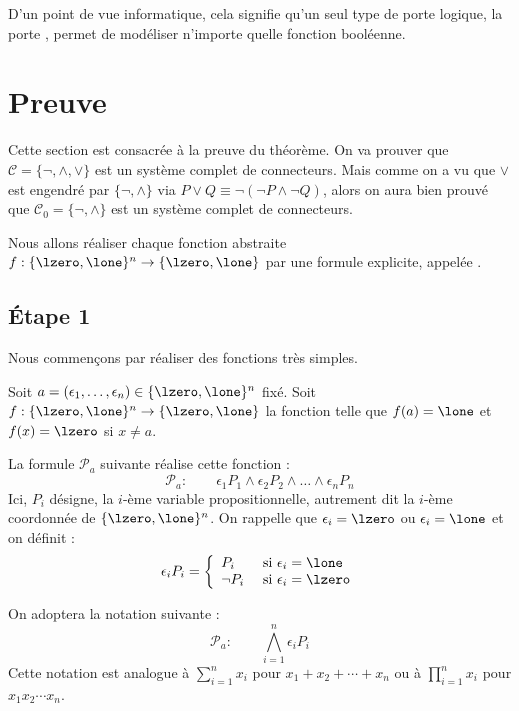 \documentclass[11pt,class=report,crop=false]{standalone}
\begin{document}
D'un point de vue informatique, cela signifie qu'un seul type de porte logique, la porte , permet de modéliser n'importe quelle fonction booléenne.


\section{Preuve}

Cette section est consacrée à la preuve du théorème.
On va prouver que $\mathcal{C} = \{\lnot, \land,\lor\}$ est un système complet de connecteurs.
Mais comme on a vu que $\lor$ est engendré par $\{ \lnot, \land \}$ via $P \lor Q \equiv \lnot(\lnot P \land \lnot Q)$, alors on aura bien prouvé que $\mathcal{C}_0 = \{\lnot, \land\}$ est un système complet de connecteurs.


Nous allons réaliser chaque fonction abstraite  $f : \{\lzero,\lone\}^n \to \{\lzero,\lone\}$ par une formule explicite, appelée .

\subsection{Étape 1}

Nous commençons par réaliser des fonctions très simples.

Soit $a = (\epsilon_1,\ldots,\epsilon_n) \in \{\lzero,\lone\}^n$ fixé.
Soit $f : \{\lzero,\lone\}^n \to \{\lzero,\lone\}$ la fonction telle que $f(a) = \lone$ et
$f(x) = \lzero$ si $x \neq a$.

La formule $\mathcal{P}_a$ suivante réalise cette fonction :
\[
\mathcal{P}_a : \qquad
\epsilon_1 P_1 \land \epsilon_2 P_2 \land \ldots \land \epsilon_n P_n
\]
Ici, $P_i$ désigne, la $i$-ème variable propositionnelle, autrement dit la $i$-ème coordonnée de $\{\lzero,\lone\}^n$.
On rappelle que $\epsilon_i = \lzero$ ou $\epsilon_i=\lone$ et on définit : 
\[
\epsilon_i P_i = \left\{ 
\begin{array}{ll}
	P_i & \text{ si } \epsilon_i = \lone \\
	\lnot P_i & \text{ si } \epsilon_i = \lzero \\	
\end{array}	
\right.
\]

On adoptera la notation suivante :
\[
\mathcal{P}_a : \qquad
\bigwedge_{i=1}^n \epsilon_i P_i
\]
Cette notation est analogue à $\displaystyle \sum_{i=1}^n x_i$ pour $x_1+x_2+\cdots+x_n$ ou à $\displaystyle \prod_{i=1}^n x_i$ pour $x_1x_2\cdots x_n$.
\end{document}
